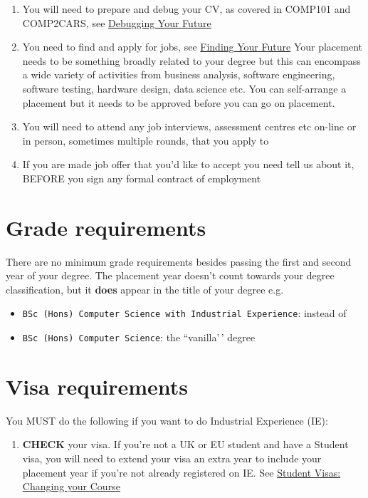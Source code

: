 \documentclass[
]{book}
\providecommand{\tightlist}{%
  \setlength{\itemsep}{0pt}\setlength{\parskip}{0pt}}
\begin{document}
\begin{enumerate}
\def\labelenumi{\arabic{enumi}.}
\tightlist
\item
  You will need to prepare and debug your CV, as covered in COMP101 and COMP2CARS, see \href{https://www.cdyf.me/debugging}{Debugging Your Future} \citep{debugging}
\item
  You need to find and apply for jobs, see \href{https://www.cdyf.me/finding}{Finding Your Future} \citep{finding} Your placement needs to be something broadly related to your degree but this can encompass a wide variety of activities from business analysis, software engineering, software testing, hardware design, data science etc. You can self-arrange a placement but it needs to be approved before you can go on placement.
\item
  You will need to attend any job interviews, assessment centres etc on-line or in person, sometimes multiple rounds, that you apply to
\item
  If you are made job offer that you'd like to accept you need tell us about it, BEFORE you sign any formal contract of employment
\end{enumerate}

\section{Grade requirements}\label{grade-requirements}

There are no minimum grade requirements besides passing the first and second year of your degree. The placement year doesn't count towards your degree classification, but it \textbf{does} appear in the title of your degree e.g.

\begin{itemize}
\tightlist
\item
  \texttt{BSc\ (Hons)\ Computer\ Science\ with\ Industrial\ Experience}: instead of
\item
  \texttt{BSc\ (Hons)\ Computer\ Science}: the ``vanilla'\,' degree
\end{itemize}

\section{Visa requirements}\label{visa-requirements}

You MUST do the following if you want to do Industrial Experience (IE):

\begin{enumerate}
\def\labelenumi{\arabic{enumi}.}
\tightlist
\item
  \textbf{CHECK} your visa. If you're not a UK or EU student and have a Student visa, you will need to extend your visa an extra year to include your placement year if you're not already registered on IE. See \href{documents.manchester.ac.uk/display.aspx?DocID=37044}{Student Visas: Changing your Course} \citep{changing}
\end{enumerate}
\end{document}
